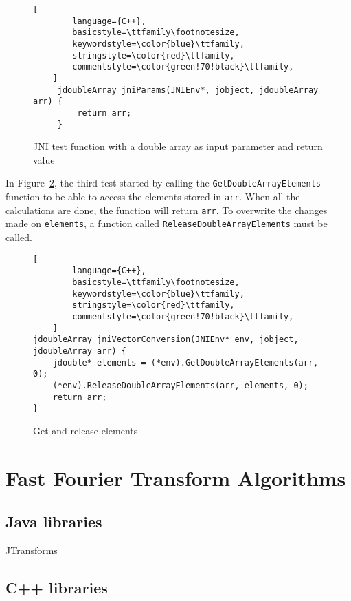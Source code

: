 \begin{figure}
\begin{lstlisting}[
        language={C++},
        basicstyle=\ttfamily\footnotesize,
        keywordstyle=\color{blue}\ttfamily,
        stringstyle=\color{red}\ttfamily,
        commentstyle=\color{green!70!black}\ttfamily,
    ]
     jdoubleArray jniParams(JNIEnv*, jobject, jdoubleArray arr) {
         return arr;
     }
\end{lstlisting}
\caption{JNI test function with a double array as input parameter and return value}
\label{fig:jni:params}
\end{figure}

In Figure~\ref{fig:jni:conversion}, the third test started by calling the \texttt{GetDoubleArrayElements} function to be able to access the elements stored in \texttt{arr}. When all the calculations are done, the function will return \texttt{arr}. To overwrite the changes made on \texttt{elements}, a function called \texttt{ReleaseDoubleArrayElements} must be called.

\begin{figure}
\begin{lstlisting}[
        language={C++},
        basicstyle=\ttfamily\footnotesize,
        keywordstyle=\color{blue}\ttfamily,
        stringstyle=\color{red}\ttfamily,
        commentstyle=\color{green!70!black}\ttfamily,
    ]
jdoubleArray jniVectorConversion(JNIEnv* env, jobject, jdoubleArray arr) {
    jdouble* elements = (*env).GetDoubleArrayElements(arr, 0);
    (*env).ReleaseDoubleArrayElements(arr, elements, 0);
    return arr;
}
\end{lstlisting}
\caption{Get and release elements}
\label{fig:jni:conversion}
\end{figure}

\section{Fast Fourier Transform Algorithms}

\subsection{Java libraries}
JTransforms \cite{jtransforms:benchmark}

\subsection{C++ libraries}
\cite{FFTW05}

